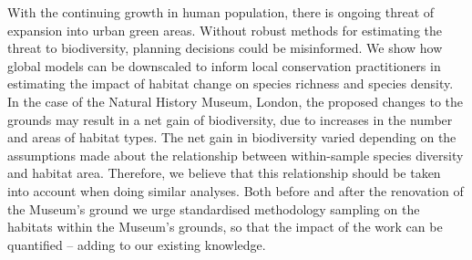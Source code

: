 With the continuing growth in human population, there is ongoing threat of expansion into urban green areas. Without robust methods for estimating the threat to biodiversity, planning decisions could be misinformed. We show how global models can be downscaled to inform local conservation practitioners in estimating the impact of habitat change on species richness and species density. In the case of the Natural History Museum, London, the proposed changes to the grounds may result in a net gain of biodiversity, due to increases in the number and areas of habitat types. The net gain in biodiversity varied depending on the assumptions made about the relationship between within-sample species diversity and habitat area. Therefore, we believe that this relationship should be taken into account when doing similar analyses. Both before and after the renovation of the Museum's ground we urge standardised methodology sampling on the habitats within the Museum's grounds, so that the impact of the work can be quantified -- adding to our existing knowledge.

